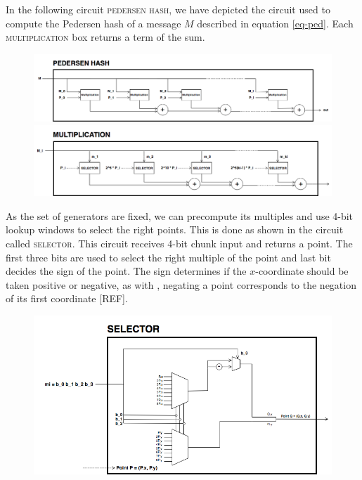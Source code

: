 In the following circuit \textsc{pedersen hash}, we have depicted the circuit used to compute the Pedersen hash of a message $M$ described in equation \ref{eq-ped}. Each \textsc{multiplication} box returns a term of the sum. 

\begin{figure}[h]
	\centering
	\includegraphics[scale=0.4]{figures/pedersen-hash.png}
	\includegraphics[scale=0.4]{figures/pedersen-multiplication.png}
\end{figure}

As the set of generators are fixed, we can precompute its multiples and use 4-bit lookup windows to select the right points. This is done as shown in the circuit called \textsc{selector}. This circuit receives 4-bit chunk input and returns a point. The first three bits are used to select the right multiple of the point and last bit decides the sign of the point. The sign determines if the $x$-coordinate should be taken positive or negative, as with , negating a point corresponds to the negation of its first coordinate [REF]. 

\begin{figure}[h]
	\centering
	\includegraphics[scale=0.5]{figures/pedersen-multiplication-selector.png}
\end{figure}

